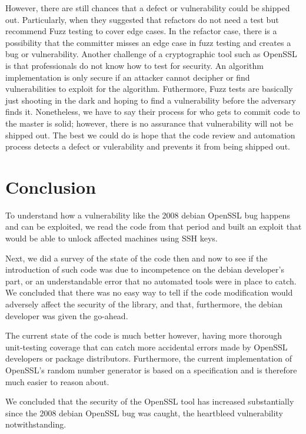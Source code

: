 \documentclass[conference]{IEEEtran}
\begin{document}
    \quad However, there are still chances that a defect or
    vulnerability could be shipped out. Particularly, when they
    suggested that refactors do not need a test but recommend Fuzz
    testing to cover edge cases. In the refactor case, there is a
    possibility that the committer misses an edge case in fuzz testing
    and creates a bug or vulnerability.  Another challenge of a
    cryptographic tool such as OpenSSL is that professionals do not
    know how to test for security. An algorithm implementation is only
    secure if an attacker cannot decipher or find vulnerabilities to
    exploit for the algorithm. Futhermore, Fuzz tests are basically
    just shooting in the dark and hoping to find a vulnerability
    before the adversary finds it.  Nonetheless, we have to say their
    process for who gets to commit code to the master is solid;
    however, there is no assurance that vulnerability will not be
    shipped out.  The best we could do is hope that the code review
    and automation process detects a defect or vulerability and
    prevents it from being shipped out.

\section{Conclusion}
To understand how a vulnerability like the 2008 debian OpenSSL bug
happens and can be exploited, we read the code from that period and
built an exploit that would be able to unlock affected machines using
SSH keys.

Next, we did a survey of the state of the code then and now to see if
the introduction of such code was due to incompetence on the debian
developer's part, or an understandable error that no automated tools
were in place to catch. We concluded that there was no easy way to
tell if the code modification would adversely affect the security of
the library, and that, furthermore, the debian developer was given the
go-ahead.

The current state of the code is much better however, having more
thorough unit-testing coverage that can catch more accidental errors
made by OpenSSL developers or package distributors. Furthermore, the
current implementation of OpenSSL's random number generator is based
on a specification and is therefore much easier to reason about.

We concluded that the security of the OpenSSL tool has increased
substantially since the 2008 debian OpenSSL bug was caught, the
heartbleed vulnerability notwithstanding.
    
\end{document}
